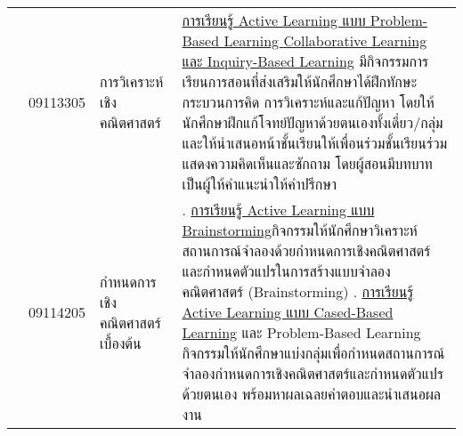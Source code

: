 {\begin{center}
\begin{longtable}{|p{}|p{}|p{}|>{\raggedcolumns}p{}|}
	& 09113305
	& การวิเคราะห์เชิงคณิตศาสตร์ & \underline{การเรียนรู้ Active Learning แบบ Problem-Based Learning } \underline{Collaborative Learning และ Inquiry-Based Learning} มีกิจกรรมการเรียนการสอนที่ส่งเสริมให้นักศึกษาได้ฝึกทักษะกระบวนการคิด การวิเคราะห์และแก้ปัญหา โดยให้นักศึกษาฝึกแก้โจทย์ปัญหาด้วยตนเองทั้งเดี่ยว/กลุ่ม และให้นำเสนอหน้าชั้นเรียนให้เพื่อนร่วมชั้นเรียนร่วมแสดงความคิดเห็นและซักถาม โดยผู้สอนมีบทบาทเป็นผู้ให้คำแนะนำให้คำปรึกษา 
	\\ \cline{2-4}
	
	& 09114205
	& กำหนดการเชิงคณิตศาสตร์เบื้องต้น &1. \underline{การเรียนรู้ Active Learning แบบ Brainstorming}\newline กิจกรรมให้นักศึกษาวิเคราะห์สถานการณ์จำลองด้วยกำหนดการเชิงคณิตศาสตร์และกำหนดตัวแปรในการสร้างแบบจำลองคณิตศาสตร์ (Brainstorming) \newline
	2. \underline{การเรียนรู้ Active Learning แบบ Cased-Based Learning} และ Problem-Based Learning กิจกรรมให้นักศึกษาแบ่งกลุ่มเพื่อกำหนดสถานการณ์จำลองกำหนดการเชิงคณิตศาสตร์และกำหนดตัวแปรด้วยตนเอง พร้อมหาผลเฉลยคำตอบและนำเสนอผลงาน 
	

\end{longtable}
\end{center}}

